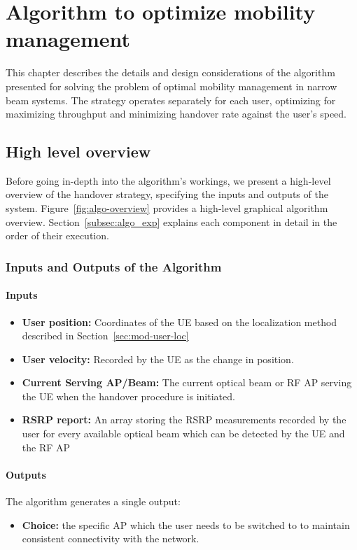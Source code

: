 \chapter{Algorithm to optimize mobility management}
\label{chp:problem_statement}

This chapter describes the details and design considerations of the algorithm presented for solving the problem of optimal mobility management in narrow beam systems. The strategy operates separately for each user, optimizing for maximizing throughput and minimizing handover rate against the user's speed.
\section{High level overview}
Before going in-depth into the algorithm's workings, we present a high-level overview of the handover strategy, specifying the inputs and outputs of the system. Figure~\ref{fig:algo-overview} provides a high-level graphical algorithm overview. Section~\ref{subsec:algo_exp} explains each component in detail in the order of their execution.
\subsection{Inputs and Outputs of the Algorithm}
\subsubsection{Inputs}
\label{subsec:algo-input}
\begin{itemize}
    \item \textbf{User position:} Coordinates of the UE based on the localization method described in Section~\ref{sec:mod-user-loc}
    \item \textbf{User velocity:} Recorded by the UE as the change in position. 
    \item \textbf{Current Serving AP/Beam:} The current optical beam or RF AP serving the UE when the handover procedure is initiated.
    \item \textbf{RSRP report:} An array storing the RSRP measurements recorded by the user for every available optical beam which can be detected by the UE and the RF AP
\end{itemize}
\subsubsection{Outputs}
The algorithm generates a single output:
\begin{itemize}
    \item \textbf{Choice:} the specific AP which the user needs to be switched to to maintain consistent connectivity with the network.
\end{itemize}
